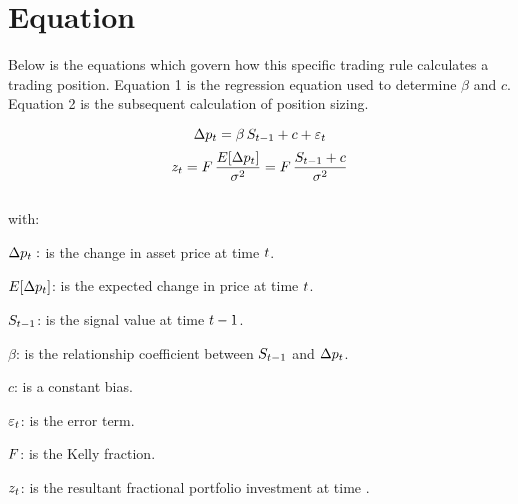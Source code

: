 \documentclass{article}
\begin{document}
\section{Equation}
Below is the equations which govern how this specific trading rule calculates a trading position. Equation 1 is the regression equation used to determine $\beta$ and $c$. Equation 2 is the subsequent calculation of position sizing.

\begin{equation}
\label{eqn:SignalRegression}
\Delta p_{t} = \beta \, S_{t-1} + c + \varepsilon_{t}
\end{equation}
\begin{equation}
\label{eqn:portfolioallocation}
    z_{t} = F \, \frac{E[\Delta p_{t}]}{\sigma^{2}} = F \, \frac{S_{t-1} + c}{\sigma^{2}}
\end{equation}
\\
with:

$\Delta p_{t}:$ is the change in asset price at time $t$.

$E[\Delta p_{t}]$: is the expected change in price at time $t$.

$S_{t-1}$: is the signal value at time $t-1$.

$\beta$: is the relationship coefficient between $S_{t-1}$ and $\Delta p_{t}$.

$c$: is a constant bias.

$\varepsilon_{t}$: is the error term.

$F$: is the Kelly fraction.

$z_{t}$: is the resultant fractional portfolio investment at time \currenttime.


\keyterms
\furtherlinks %
\end{document}
